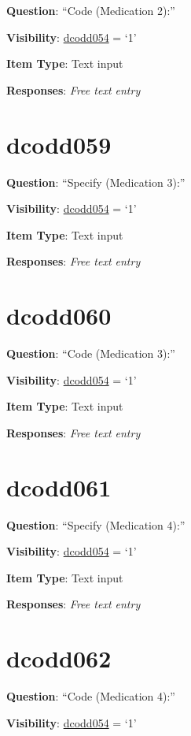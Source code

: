 \documentclass[]{book}
\begin{document}
\textbf{Question}: ``Code (Medication 2):''

\textbf{Visibility}: \protect\hyperlink{dcodd054}{dcodd054} = `1'

\textbf{Item Type}: Text input

\textbf{Responses}: \emph{Free text entry}

\hypertarget{dcodd059}{%
\section{dcodd059}\label{dcodd059}}

\textbf{Question}: ``Specify (Medication 3):''

\textbf{Visibility}: \protect\hyperlink{dcodd054}{dcodd054} = `1'

\textbf{Item Type}: Text input

\textbf{Responses}: \emph{Free text entry}

\hypertarget{dcodd060}{%
\section{dcodd060}\label{dcodd060}}

\textbf{Question}: ``Code (Medication 3):''

\textbf{Visibility}: \protect\hyperlink{dcodd054}{dcodd054} = `1'

\textbf{Item Type}: Text input

\textbf{Responses}: \emph{Free text entry}

\hypertarget{dcodd061}{%
\section{dcodd061}\label{dcodd061}}

\textbf{Question}: ``Specify (Medication 4):''

\textbf{Visibility}: \protect\hyperlink{dcodd054}{dcodd054} = `1'

\textbf{Item Type}: Text input

\textbf{Responses}: \emph{Free text entry}

\hypertarget{dcodd062}{%
\section{dcodd062}\label{dcodd062}}

\textbf{Question}: ``Code (Medication 4):''

\textbf{Visibility}: \protect\hyperlink{dcodd054}{dcodd054} = `1'
\end{document}
